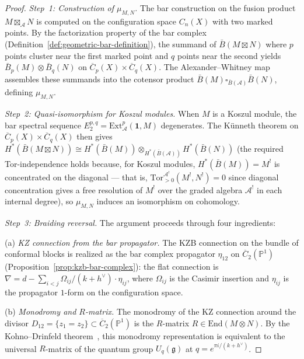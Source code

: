 \begin{proof}
\emph{Step~1: Construction of $\mu_{M,N}$.}
The bar construction on the fusion product
$M \boxtimes_{\mathcal{A}} N$ is computed on the configuration space
$C_n(X)$ with two marked points.  By the factorization property of
the bar complex (Definition~\ref{def:geometric-bar-definition}), the
summand of $\bar{B}(M \boxtimes N)$ where $p$ points cluster
near the first marked point and $q$ points near the second yields
$\bar{B}_p(M) \otimes \bar{B}_q(N)$ on
$\overline{C}_p(X) \times \overline{C}_q(X)$.  The Alexander--Whitney
map assembles these summands into the cotensor product
$\bar{B}(M) \square_{\bar{B}(\mathcal{A})} \bar{B}(N)$, defining
$\mu_{M,N}$.

\emph{Step~2: Quasi-isomorphism for Koszul modules.}
When $M$ is a Koszul module, the bar spectral sequence
$E_2^{p,q} = \mathrm{Ext}^p_{\mathcal{A}}(\mathbf{1}, M)$
degenerates.  The K\"unneth theorem on
$\overline{C}_p(X) \times \overline{C}_q(X)$ then gives
$H^*(\bar{B}(M \boxtimes N))
\cong H^*(\bar{B}(M)) \otimes_{H^*(\bar{B}(\mathcal{A}))}
H^*(\bar{B}(N))$
(the required Tor-independence holds because, for Koszul modules,
$H^*(\bar{B}(M)) = M^!$ is concentrated on the diagonal ---
that is, $\mathrm{Tor}^{\mathcal{A}^!}_{>0}(M^!, N^!) = 0$ since
diagonal concentration gives a free resolution of $M^!$ over the
graded algebra $\mathcal{A}^!$ in each internal degree),
so $\mu_{M,N}$ induces an isomorphism on cohomology.

\emph{Step~3: Braiding reversal.}
The argument proceeds through four ingredients:

\noindent (a) \emph{KZ connection from the bar propagator.}
The KZB connection on the bundle of conformal blocks is realized
as the bar complex propagator $\eta_{12}$ on
$\overline{C}_2(\mathbb{P}^1)$
(Proposition~\ref{prop:kzb-bar-complex}): the flat connection is
$\nabla = d - \sum_{i<j} \Omega_{ij}/(k+h^\vee) \cdot \eta_{ij}$,
where $\Omega_{ij}$ is the Casimir insertion and $\eta_{ij}$ is
the propagator $1$-form on the configuration space.

\noindent (b) \emph{Monodromy and $R$-matrix.}
The monodromy of the KZ connection around the divisor
$D_{12} = \{z_1 = z_2\} \subset \overline{C}_2(\mathbb{P}^1)$
is the $R$-matrix $R \in \mathrm{End}(M \otimes N)$.  By the
Kohno--Drinfeld theorem~\cite{Kohno87, Drinfeld90}, this monodromy
representation is equivalent to the universal $R$-matrix of the
quantum group $U_q(\mathfrak{g})$ at $q = e^{\pi i/(k+h^\vee)}$.


\end{proof}
